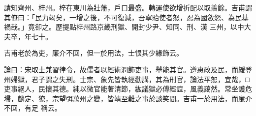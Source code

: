 \begin{pinyinscope}
 請知齊州、梓州。梓在東川為壯藩，戶口最盛。轉運使欲增折配以取羨餘。吉甫謂其僚曰：「民力竭矣，一增之後，不可復減，吾寧貽使者怒，忍為國斂怨、為民基禍哉。」竟卻之。歷提點梓州路京畿刑獄、開封少尹、知同、刑、漢
 三州，以中大夫卒，年七十。



 吉甫老於為吏，廉介不回，但一於用法，士恨其少緣飾云。



 論曰：宋取士兼習律令，故儒者以經術潤飾吏事，舉能其官。遵惠政及民，而緩登州婦獄，君子謂之失刑。士宗、象先皆執經勸講，其為刑官，論法平恕，宜哉，□吏事絕人，民懷其德。純以微官能著清節，紘議獄必傅經誼，風義藹然。常坐護危埽，麟定、獠，宗望弭萬州之變，皆靖至難之事於談笑間。吉甫一於用法，而廉介不回，有足
 稱云。



\end{pinyinscope}